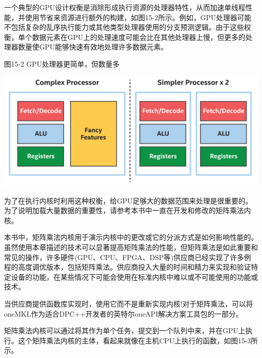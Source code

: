一个典型的GPU设计权衡是消除形成执行资源的处理器特性，从而加速单线程性能，并使用节省来资源进行额外的构建，如图15-2所示。例如，GPU处理器可能不包括复杂的乱序执行能力或其他类型处理器使用的分支预测逻辑。由于这些权衡，单个数据元素在GPU上的处理速度可能会比在其他处理器上慢，但更多的处理器数量使GPU能够快速有效地处理许多数据元素。\par

\hspace*{\fill} \par %
图15-2 GPU处理器更简单，但数量多
\begin{center}
	\includegraphics[width=1.0\textwidth]{content/chapter-15/images/3}
\end{center}

为了在执行内核时利用这种权衡，给GPU足够大的数据范围来处理是很重要的。为了说明加载大量数据的重要性，请参考本书中一直在开发和修改的矩阵乘法内核。\par

\begin{tcolorbox}[colback=blue!5!white,colframe=blue!75!black, title=关于矩阵乘法]
本书中，矩阵乘法内核用于演示内核中的更改或它的分派方式是如何影响性能的。虽然使用本章描述的技术可以显著提高矩阵乘法的性能，但矩阵乘法是如此重要和常见的操作，许多硬件(GPU、CPU、FPGA、DSP等)供应商已经实现了许多例程的高度调优版本，包括矩阵乘法。供应商投入大量的时间和精力来实现和验证特定设备的功能，在某些情况下可能会使用在标准内核中难以或不可能使用的功能或技术。
\end{tcolorbox}

\begin{tcolorbox}[colback=blue!5!white,colframe=blue!75!black, title=使用供应商提供的库!]
当供应商提供函数库实现时，使用它而不是重新实现内核!对于矩阵乘法，可以将oneMKL作为适合DPC++开发者的英特尔oneAPI解决方案工具包的一部分。
\end{tcolorbox}

矩阵乘法内核可以通过将其作为单个任务，提交到一个队列中来，并在GPU上执行。这个矩阵乘法内核的主体，看起来就像在主机CPU上执行的函数，如图15-3所示。\par

